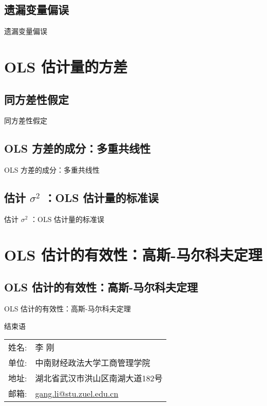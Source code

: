 \documentclass[UTF8]{ctexbeamer}
\begin{document}
\subsection{遗漏变量偏误}
\begin{frame}{遗漏变量偏误}
\end{frame}


\section{OLS 估计量的方差}
\subsection{同方差性假定}
\begin{frame}{同方差性假定}
\end{frame}

\subsection{OLS 方差的成分：多重共线性}
\begin{frame}{OLS 方差的成分：多重共线性}
\end{frame}

\subsection{估计 $\sigma^2$ ：OLS 估计量的标准误}
\begin{frame}{估计 $\sigma^2$ ：OLS 估计量的标准误}
\end{frame}

\section{OLS 估计的有效性：高斯-马尔科夫定理}
\subsection{OLS 估计的有效性：高斯-马尔科夫定理}
\begin{frame}{OLS 估计的有效性：高斯-马尔科夫定理}
\end{frame}

\begin{frame}{结束语}
\linespread{1.25}
\begin{center}
\vspace{5mm}\large
\begin{tabular}{ll}
{\sc 姓名}:  & \textsf{李 刚}\\
{\sc 单位}: & 中南财经政法大学工商管理学院 \\
{\sc 地址}: & 湖北省武汉市洪山区南湖大道182号 \\
{\sc 邮箱}: & \href{mailto:gang.li@stu.zuel.edu.cn}{\color{blue}gang.li@stu.zuel.edu.cn}\\
\end{tabular}
\end{center}
\end{frame}
\end{document}
